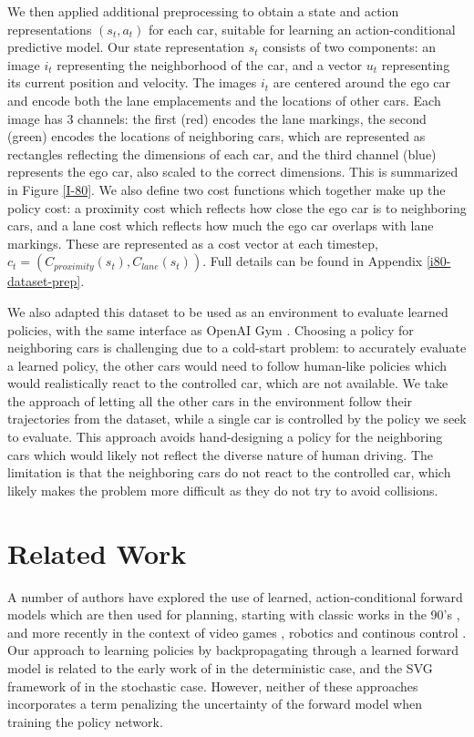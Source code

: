 \documentclass{article} %
\begin{document}
We then applied additional preprocessing to obtain a state and action representations $(s_t, a_t)$ for each car, suitable for learning an action-conditional predictive model.
Our state representation $s_t$ consists of two components: an image $i_t$ representing the neighborhood of the car, and a vector $u_t$ representing its current position and velocity.
The images $i_t$ are centered around the ego car and encode both the lane emplacements and the locations of other cars.
Each image has 3 channels: the first (red) encodes the lane markings, the second (green) encodes the locations of neighboring cars, which are represented as rectangles reflecting the dimensions of each car, and the third channel (blue) represents the ego car, also scaled to the correct dimensions.
This is summarized in Figure \ref{I-80}.
We also define two cost functions which together make up the policy cost: a proximity cost which reflects how close the ego car is to neighboring cars, and a lane cost which reflects how much the ego car overlaps with lane markings. These are represented as a cost vector at each timestep, $c_t = (C_{proximity}(s_t), C_{lane}(s_t))$. Full details can be found in Appendix \ref{i80-dataset-prep}. 


We also adapted this dataset to be used as an environment to evaluate learned policies, with the same interface as OpenAI Gym \citep{OpenAIBaselines}.
Choosing a policy for neighboring cars is challenging due to a cold-start problem: to accurately evaluate a learned policy, the other cars would need to follow human-like policies which would realistically react to the controlled car, which are not available.
We take the approach of letting all the other cars in the environment follow their trajectories from the dataset, while a single car is controlled by the policy we seek to evaluate.
This approach avoids hand-designing a policy for the neighboring cars which would likely not reflect the diverse nature of human driving.
The limitation is that the neighboring cars do not react to the controlled car, which likely makes the problem more difficult as they do not try to avoid collisions.

  
\section{Related Work}

A number of authors have explored the use of learned, action-conditional forward models which are then used for planning, starting with classic works in the 90's \citep{Nguyen1990, Schmidhuber1990, Jordan1992}, and more recently in the context of video games \citep{Oh15, Pascanu17, I2A}, robotics and continous control \citep{FinnGL16, Poke, Nagabandi2017, UPN}.
Our approach to learning policies by backpropagating through a learned forward model is related to the early work of \citep{Nguyen1989} in the deterministic case, and the SVG framework of \citep{SVG} in the stochastic case. However, neither of these approaches incorporates a term penalizing the uncertainty of the forward model when training the policy network.
\end{document}
